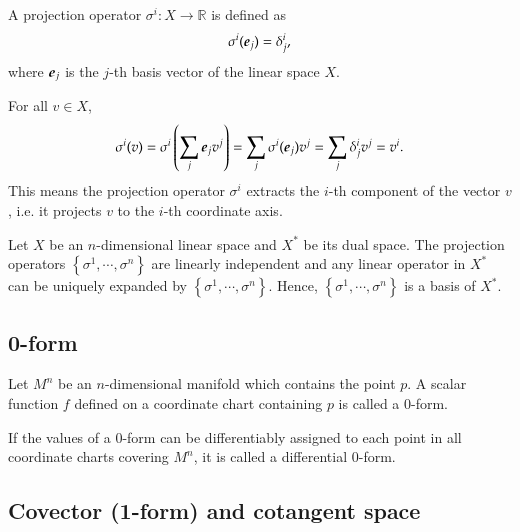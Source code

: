 \documentclass[11pt, a4paper]{book}
\begin{document}
\begin{Definition}
  A projection operator $\sigma^i: X \rightarrow \mathbb{R}$ is defined as
  \begin{equation*}
    \sigma^i(\boldsymbol{e}_j) = \delta^i_j,
  \end{equation*}
  where $\boldsymbol{e}_j$ is the $j$-th basis vector of the linear space $X$.
\end{Definition}

For all $v\in X$,
\begin{equation*}
  \sigma^i(v) = \sigma^{i}\left( \sum_j\boldsymbol{e}_jv^j \right) = \sum_j
  \sigma^i(\boldsymbol{e}_j) v^j = \sum_j\delta^i_j v^j = v^i.
\end{equation*}
This means the projection operator $\sigma^i$ extracts the $i$-th component of the
vector $v$, i.e. it projects $v$ to the $i$-th coordinate axis.

\begin{Proposition}
  Let $X$ be an $n$-dimensional linear space and $X^{*}$ be its dual space. The projection
  operators $\left\{ \sigma^1,\cdots,\sigma^n \right\}$ are linearly independent and any
  linear operator in $X^{*}$ can be uniquely expanded by $\left\{ \sigma^1,\cdots,\sigma^n
  \right\}$. Hence, $\left\{ \sigma^1,\cdots,\sigma^n \right\}$ is a basis of $X^{*}$.
\end{Proposition}

\subsection{0-form}
\label{sec:0-form}

\begin{Definition}[0-form]
  Let $M^n$ be an $n$-dimensional manifold which contains the point $p$. A scalar function
  $f$ defined on a coordinate chart containing $p$ is called a 0-form.
\end{Definition}

\begin{Definition}
  If the values of a 0-form can be differentiably assigned to each point in all coordinate
  charts covering $M^n$, it is called a differential 0-form.
\end{Definition}

\subsection{Covector (1-form) and cotangent space}
\label{sec:1-form}
\end{document}
